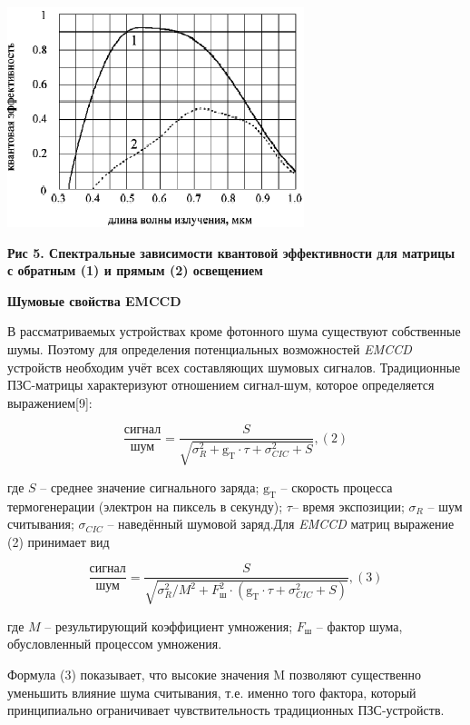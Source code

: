 \documentclass[11pt]{article}
\begin{document}
\includegraphics[width=0.8\linewidth]{9.png}
\begin{center}
\textbf{Рис 5. Спектральные зависимости квантовой эффективности для матрицы
с обратным (1) и прямым (2) освещением}
\end{center}

\begin{center}
\textbf{Шумовые свойства EMCCD}
\end{center}

В рассматриваемых устройствах кроме фотонного шума существуют собственные
шумы. Поэтому для определения потенциальных возможностей \textit {EMCCD} устройств
необходим учёт всех составляющих шумовых сигналов. Традиционные ПЗС-матрицы характеризуют отношением сигнал-шум, которое определяется выражением[9]:

$$\frac{\text{сигнал}}{\text{шум}}=\frac{S}{\sqrt{\sigma_R^2+\mathrm{g_T}\cdot\tau+\sigma_{CIC}^2+S}}, (2)$$

где $S$ – среднее значение сигнального заряда; $\mathrm{g_T}$ – скорость процесса термогенерации (электрон на пиксель в секунду); $\tau$– время экспозиции; $\sigma_R$ – шум считывания; $\sigma_{CIC}$ – наведённый шумовой заряд.Для \textit{EMCCD} матриц выражение (2) принимает вид

$$\frac{\text{сигнал}}{\text{шум}}=\frac{S}{\sqrt{\sigma_R^2/M^2+F_{\textit{ш}}^2\cdot(\mathrm{g_T}\cdot\tau+\sigma_{CIC}^2+S)}}, (3)$$

где $M$ – результирующий коэффициент умножения; $F_{\textit{ш}}$ – фактор шума, обусловленный процессом умножения. 

Формула (3) показывает, что высокие значения M позволяют существенно уменьшить влияние шума считывания, т.е. именно того фактора, который принципиально ограничивает чувствительность традиционных ПЗС-устройств.
\end{document}
